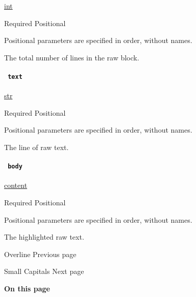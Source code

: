 \href{/docs/reference/foundations/int/}{int}

{Required} {{ Positional }}

\label{definitions-line-count-positional-tooltip}
Positional parameters are specified in order, without names.

The total number of lines in the raw block.

\paragraph{\texorpdfstring{\texttt{\ text\ }}{ text }}\label{definitions-line-text}

\href{/docs/reference/foundations/str/}{str}

{Required} {{ Positional }}

\label{definitions-line-text-positional-tooltip}
Positional parameters are specified in order, without names.

The line of raw text.

\paragraph{\texorpdfstring{\texttt{\ body\ }}{ body }}\label{definitions-line-body}

\href{/docs/reference/foundations/content/}{content}

{Required} {{ Positional }}

\label{definitions-line-body-positional-tooltip}
Positional parameters are specified in order, without names.

The highlighted raw text.

\href{/docs/reference/text/overline/}{\pandocbounded{}}

{ Overline } { Previous page }

\href{/docs/reference/text/smallcaps/}{\pandocbounded{}}

{ Small Capitals } { Next page }

\textbf{On this page}

